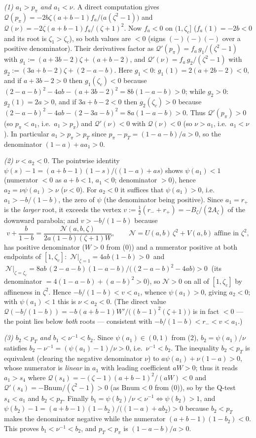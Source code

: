 \documentclass[
]{article}
\begin{document}
\emph{(1) $a_1>p_\pi$ and $a_1<\nu$.} A direct computation gives
$\mathcal Q(p_\pi)=-2b\zeta(a+b-1)f_a/\bigl(a(\zeta^2-1)\bigr)$ and
$\mathcal Q(\nu)=-2\zeta(a+b-1)f_a/(\zeta+1)^2$. Now $f_a<0$ on
$(1,\zeta_c]$ ($f_a(1)=-2b<0$ and its root is $\zeta_1>\zeta_c$), so both
values are $<0$ (signs $(-)(-)(-)$ over a positive denominator). Their
derivatives factor as $\mathcal Q'(p_\pi)=f_a\,g_1/(\zeta^2-1)$ with
$g_1:=(a+3b-2)\zeta+(a+b-2)$, and $\mathcal Q'(\nu)=f_a\,g_2/(\zeta^2-1)$ with
$g_2:=(3a+b-2)\zeta+(2-a-b)$. Here $g_1<0$: $g_1(1)=2(a+2b-2)<0$, and if
$a+3b-2>0$ then $g_1(\zeta_c)<0$ because $(2-a-b)^2-4ab-(a+3b-2)^2=8b(1-a-b)>0$;
while $g_2>0$: $g_2(1)=2a>0$, and if $3a+b-2<0$ then $g_2(\zeta_c)>0$ because
$(2-a-b)^2-4ab-(2-3a-b)^2=8a(1-a-b)>0$. Thus $\mathcal Q'(p_\pi)>0$
(so $p_\pi<a_1$, i.e.\ $a_1>p_\pi$) and $\mathcal Q'(\nu)<0$ with
$\mathcal Q(\nu)<0$ (so $\nu>a_1$, i.e.\ $a_1<\nu$). In particular $a_1>p_\pi>
p_T$ since $p_\pi-p_T=(1-a-b)/a>0$, so the denominator $(1-a)+aa_1>0$.

\emph{(2) $\nu<a_2<0$.} The pointwise identity
$\psi(s)-1=(a+b-1)(1-s)/\bigl((1-a)+as\bigr)$ shows $\psi(a_1)<1$ (numerator
$<0$ as $a+b<1$, $a_1<0$; denominator $>0$), hence $a_2=\nu\psi(a_1)>\nu$
($\nu<0$). For $a_2<0$ it suffices that $\psi(a_1)>0$, i.e.\ $a_1>-b/(1-b)$, the
zero of $\psi$ (the denominator being positive). Since $a_1=r_+$ is the
\emph{larger} root, it exceeds the vertex $v:=\tfrac12(r_-+r_+)=-B_\zeta/(2A_\zeta)$
of the downward parabola; and $v>-b/(1-b)$ because
\[
  v+\frac{b}{1-b}=\frac{\mathcal N(a,b,\zeta)}{2a(1-b)(\zeta+1)W},
  \qquad \mathcal N=U(a,b)\,\zeta^2+V(a,b)\ \text{affine in }\zeta^2,
\]
has positive denominator ($W>0$ from (0)) and a numerator positive at both
endpoints of $[1,\zeta_c]$: $\ \mathcal N|_{\zeta=1}=4ab(1-b)>0\ $ and
$\ \mathcal N|_{\zeta=\zeta_c}=8ab\,(2-a-b)(1-a-b)/\bigl((2-a-b)^2-4ab\bigr)>0\ $
(its denominator $=4(1-a-b)+(a-b)^2>0$), so $\mathcal N>0$ on all of
$[1,\zeta_c]$ by affineness in $\zeta^2$. Hence $-b/(1-b)<v<a_1$, whence
$\psi(a_1)>0$, giving $a_2<0$; with $\psi(a_1)<1$ this is $\nu<a_2<0$.
(The direct value $\mathcal Q(-b/(1-b))=-b(a+b-1)W'/\bigl((b-1)^2(\zeta+1)\bigr)$
is in fact $<0$ --- the point lies below \emph{both} roots --- consistent with
$-b/(1-b)<r_-<v<a_1$.)

\emph{(3) $b_2<p_T$ and $b_1<\nu^{-1}<b_2$.} Since $\psi(a_1)\in(0,1)$ from (2),
$b_2=\psi(a_1)/\nu$ satisfies $b_2-\nu^{-1}=(\psi(a_1)-1)/\nu>0$, i.e.\
$\nu^{-1}<b_2$. The inequality $b_2<p_T$ is equivalent (clearing the negative
denominator $\nu$) to $a\psi(a_1)+\nu(1-a)>0$, whose numerator is
\emph{linear} in $a_1$ with leading coefficient $aW>0$; thus it reads
$a_1>s_4$ where $\mathcal Q(s_4)=-(\zeta-1)(a+b-1)^2/(aW)<0$ and
$\mathcal Q'(s_4)=-\mathrm{Bnum}/(\zeta^2-1)>0$ (as $\mathrm{Bnum}<0$ from (0)),
so by the Q-test $s_4<a_1$ and $b_2<p_T$. Finally
$b_1=\psi(b_2)/\nu<\nu^{-1}\iff\psi(b_2)>1$, and
$\psi(b_2)-1=(a+b-1)(1-b_2)/\bigl((1-a)+ab_2\bigr)>0$ because $b_2<p_T$ makes the
denominator negative while the numerator $(a+b-1)(1-b_2)<0$. This proves
$b_1<\nu^{-1}<b_2$, and $p_T<p_\pi$ is $(1-a-b)/a>0$.
\end{document}
